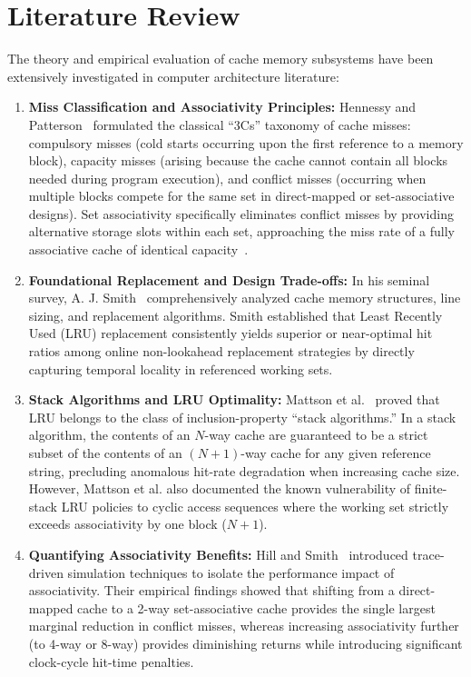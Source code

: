 \documentclass[journal,10pt,twocolumn]{IEEEtran}
\begin{document}
\section{Literature Review}
The theory and empirical evaluation of cache memory subsystems have been extensively investigated in computer architecture literature:

\begin{enumerate}
    \item \textbf{Miss Classification and Associativity Principles:} Hennessy and Patterson~\cite{hennessy2017} formulated the classical ``3Cs'' taxonomy of cache misses: compulsory misses (cold starts occurring upon the first reference to a memory block), capacity misses (arising because the cache cannot contain all blocks needed during program execution), and conflict misses (occurring when multiple blocks compete for the same set in direct-mapped or set-associative designs). Set associativity specifically eliminates conflict misses by providing alternative storage slots within each set, approaching the miss rate of a fully associative cache of identical capacity~\cite{hennessy2017}.
    \item \textbf{Foundational Replacement and Design Trade-offs:} In his seminal survey, A. J. Smith~\cite{smith1982cache} comprehensively analyzed cache memory structures, line sizing, and replacement algorithms. Smith established that Least Recently Used (LRU) replacement consistently yields superior or near-optimal hit ratios among online non-lookahead replacement strategies by directly capturing temporal locality in referenced working sets.
    \item \textbf{Stack Algorithms and LRU Optimality:} Mattson et al.~\cite{mattson1970evaluation} proved that LRU belongs to the class of inclusion-property ``stack algorithms.'' In a stack algorithm, the contents of an $N$-way cache are guaranteed to be a strict subset of the contents of an $(N+1)$-way cache for any given reference string, precluding anomalous hit-rate degradation when increasing cache size. However, Mattson et al. also documented the known vulnerability of finite-stack LRU policies to cyclic access sequences where the working set strictly exceeds associativity by one block ($N+1$).
    \item \textbf{Quantifying Associativity Benefits:} Hill and Smith~\cite{hill1989evaluating} introduced trace-driven simulation techniques to isolate the performance impact of associativity. Their empirical findings showed that shifting from a direct-mapped cache to a 2-way set-associative cache provides the single largest marginal reduction in conflict misses, whereas increasing associativity further (to 4-way or 8-way) provides diminishing returns while introducing significant clock-cycle hit-time penalties.

\end{enumerate}
\end{document}
